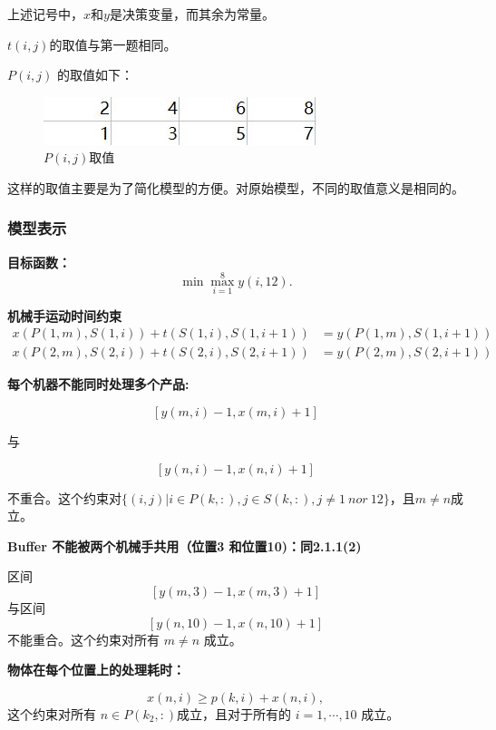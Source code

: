 \documentclass{ctexart}
\begin{document}
{{{        	上述记号中，$x$和$y$是决策变量，而其余为常量。
        	
        	$t(i, j)$的取值与第一题相同。
        	
        	$P(i,j)$ 的取值如下：
        	
        	\begin{figure}[H]
        		\centering
        		\includegraphics[width = 0.6\linewidth]{pij3.jpg}
        		\caption{$P(i,j)取值$}
        	\end{figure}
        
        	这样的取值主要是为了简化模型的方便。对原始模型，不同的取值意义是相同的。
        }
    
    	\subsubsection{模型表示}
    	{
    		\textbf{目标函数：}
    		$$\min { \max_{i=1}^{8} { y(i, 12) } }.$$
    		
    		\textbf{机械手运动时间约束}
    		$$
    		\begin{aligned}
    		x(P(1,m),S(1,i))+t(S(1,i),S(1,i+1))&=y(P(1,m),S(1,i+1))\\
    		x(P(2,m),S(2,i))+t(S(2,i),S(2,i+1))&=y(P(2,m),S(2,i+1))
    		\end{aligned}
    		$$
    		
    		\textbf{每个机器不能同时处理多个产品:}
    		
    		$$
    		[y(m,i)-1,x(m,i)+1]
    		$$
    		
    		与
    		
    		$$
    		[y(n,i)-1,x(n,i)+1]
    		$$
    		
    		不重合。这个约束对$\{(i,j) | i\in P(k,:), j\in S(k,:), j\neq 1\ nor\ 12\}$，且$m\neq n$成立。
    		
    		\textbf{Buffer 不能被两个机械手共用（位置3 和位置10)：同2.1.1(2)}
    		
    		区间 $$[ y(m,3)-1 , x(m, 3) + 1 ]$$ 与区间 $$[ y(n,10)-1 , x(n, 10) + 1 ]$$ 不能重合。这个约束对所有 $m \neq n$ 成立。
    		
    		\textbf{物体在每个位置上的处理耗时：}
    		
    		 $$x(n, i) \geq p(k,i) + x(n, i) ,$$ 这个约束对所有 $n\in P(k_2,:)$成立，且对于所有的 $i=1, \cdots, 10$ 成立。
    		 
}}}
\end{document}
